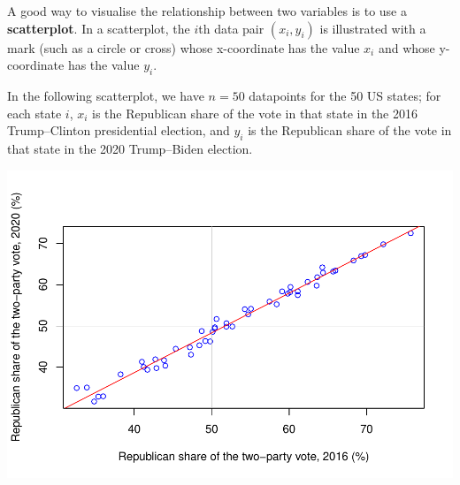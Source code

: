 \documentclass[
  a4paper,
]{book}
\newenvironment{Shaded}{\begin{snugshade}}{\end{snugshade}}
\newcommand{\AttributeTok}[1]{\textcolor[rgb]{0.77,0.63,0.00}{#1}}
\newcommand{\DecValTok}[1]{\textcolor[rgb]{0.00,0.00,0.81}{#1}}
\newcommand{\FloatTok}[1]{\textcolor[rgb]{0.00,0.00,0.81}{#1}}
\newcommand{\FunctionTok}[1]{\textcolor[rgb]{0.00,0.00,0.00}{#1}}
\newcommand{\NormalTok}[1]{#1}
\newcommand{\OtherTok}[1]{\textcolor[rgb]{0.56,0.35,0.01}{#1}}
\newcommand{\SpecialCharTok}[1]{\textcolor[rgb]{0.00,0.00,0.00}{#1}}
\newcommand{\StringTok}[1]{\textcolor[rgb]{0.31,0.60,0.02}{#1}}
\theoremstyle{definition}
\theoremstyle{definition}
\theoremstyle{definition}
\theoremstyle{definition}
\theoremstyle{remark}
\begin{document}
A good way to visualise the relationship between two variables is to use a \textbf{scatterplot}. In a scatterplot, the \(i\)th data pair \((x_i, y_i)\) is illustrated with a mark (such as a circle or cross) whose x-coordinate has the value \(x_i\) and whose y-coordinate has the value \(y_i\).

In the following scatterplot, we have \(n = 50\) datapoints for the 50 US states; for each state \(i\), \(x_i\) is the Republican share of the vote in that state in the 2016 Trump--Clinton presidential election, and \(y_i\) is the Republican share of the vote in that state in the 2020 Trump--Biden election.

\begin{Shaded}
\end{Shaded}

\includegraphics{math1710_files/figure-latex/elections-1.pdf}
\end{document}
